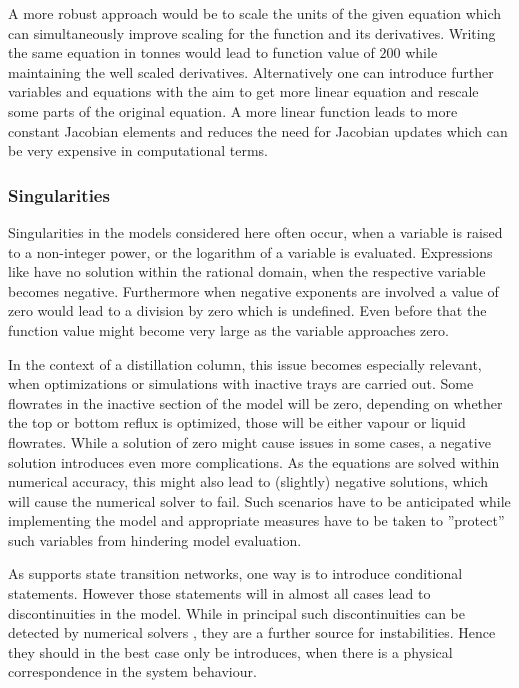         A more robust approach would be to scale the units of the given equation which can simultaneously improve
        scaling for the function and its derivatives. Writing the same equation in tonnes would lead to  function value of
        $200$ while maintaining the well scaled derivatives. Alternatively one can introduce further variables and equations
        with the aim to get more linear equation and rescale some parts of the original equation. A more linear function
        leads to more constant Jacobian elements and reduces the need for Jacobian updates which can be very expensive in
        computational terms.

        \subsubsection{Singularities}
        Singularities in the models considered here often occur, when a variable is raised to a non-integer power,
        or the logarithm of a variable is evaluated.
        Expressions like have no solution within the rational domain, when the respective variable becomes negative.
        Furthermore when negative exponents are involved a value of zero would lead to a division by zero which is
        undefined. Even before that the function value might become very large as the variable approaches zero.

        In the context of a distillation column, this issue becomes especially relevant, when optimizations or simulations
        with inactive trays are carried out. Some flowrates in the inactive section of the model will be zero, depending
        on whether the top or bottom reflux is optimized, those will be either vapour or liquid flowrates. While a
        solution of zero might cause issues in some cases, a negative solution introduces even more complications. As the
        equations are solved within numerical accuracy, this might also lead to (slightly) negative solutions, which will
        cause the numerical solver to fail. Such scenarios have to be anticipated while implementing the model and
        appropriate measures have to be taken to ''protect'' such variables from hindering model evaluation.

        As \gproms supports state transition networks, one way is to introduce conditional statements. However
        those statements will in almost all cases lead to discontinuities in the model. While in principal such
        discontinuities can be detected by numerical solvers \cite{Pantelides.2003}, they are a further source
        for instabilities. Hence they should in the best case only be introduces, when there is a physical correspondence
        in the system behaviour.

